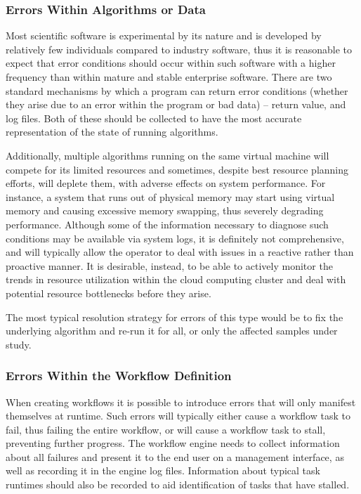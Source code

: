 \subsubsection {Errors Within Algorithms or Data}

Most scientific software is experimental by its nature and is developed by relatively few individuals compared to industry software, thus it is reasonable to expect that error conditions should occur within such software with a higher frequency than within mature and stable enterprise software. There are two standard mechanisms by which a program can return error conditions (whether they arise due to an error within the program or bad data) -- return value, and log files. Both of these should be collected to have the most accurate representation of the state of running algorithms.

Additionally, multiple algorithms running on the same virtual machine will compete for its limited resources and sometimes, despite best resource planning efforts, will deplete them, with adverse effects on system performance. For instance, a system that runs out of physical memory may start using virtual memory and causing excessive memory swapping, thus severely degrading performance. Although some of the information necessary to diagnose such conditions may be available via system logs, it is definitely not comprehensive, and will typically allow the operator to deal with issues in a reactive rather than proactive manner. It is desirable, instead, to be able to actively monitor the trends in resource utilization within the cloud computing cluster and deal with potential resource bottlenecks before they arise.

The most typical resolution strategy for errors of this type would be to fix the underlying algorithm and re-run it for all, or only the affected samples under study.

\subsubsection {Errors Within the Workflow Definition}

When creating workflows it is possible to introduce errors that will only manifest themselves at runtime. Such errors will typically either cause a workflow task to fail, thus failing the entire workflow, or will cause a workflow task to stall, preventing further progress. The workflow engine needs to collect information about all failures and present it to the end user on a management interface, as well as recording it in the engine log files. Information about typical task runtimes should also be recorded to aid identification of tasks that have stalled.

